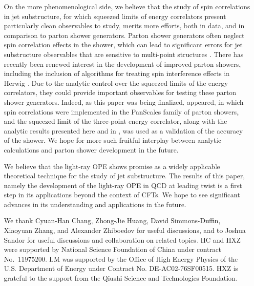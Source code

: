 \documentclass[letterpaper,11pt]{article}
\begin{document}
On the more phenomenological side, we believe that the study of spin correlations in jet substructure, for which squeezed limits of energy correlators present particularly clean observables to study, merits more efforts, both in data, and in comparison to parton shower generators. Parton shower generators often neglect spin correlation effects in the shower, which can lead to significant errors for jet substructure observables that are sensitive to multi-point structures \cite{Dasgupta:2020fwr}. There has recently been renewed interest in the development of improved parton showers, including the inclusion of algorithms for treating spin interference effects \cite{Collins:1987cp,Knowles:1988hu,Knowles:1988vs,Knowles:1987cu,Richardson:2001df,Richardson:2018pvo} in Herwig \cite{Richardson:2018pvo,Bellm:2019zci}. Due to the analytic control over the squeezed limits of the energy correlators, they could provide important observables for testing these parton shower generators. Indeed, as this paper was being finalized, \cite{1854526} appeared, in which spin correlations were implemented in the PanScales \cite{Dasgupta:2020fwr,Hamilton:2020rcu}  family of parton showers, and the squeezed limit of the three-point energy correlator, along with the analytic results presented here and in \cite{Chen:2020adz}, was used as a validation of the accuracy of the shower. We hope for more such fruitful interplay between analytic calculations and parton shower development in the future.

We believe that the light-ray OPE shows promise as a widely applicable theoretical technique for the study of jet substructure. The results of this paper, namely the development of the light-ray OPE in QCD at leading twist is a first step in its applications beyond the context of CFTs. We hope to see significant advances in its understanding and applications in the future.

\begin{acknowledgments}

We thank Cyuan-Han Chang, Zhong-Jie Huang, David Simmons-Duffin, Xiaoyuan Zhang, and Alexander Zhiboedov for useful discussions, and to Joshua Sandor for useful discussions and collaboration on related topics. 
HC and HXZ were supported by National Science Foundation of China under contract No.~11975200.  
I.M was supported by the Office of High Energy Physics of the U.S. Department of Energy under Contract No. DE-AC02-76SF00515. HXZ is grateful to the support from the Qiushi Science and Technologies Foundation.
  

\end{acknowledgments}



{}

\end{document}
